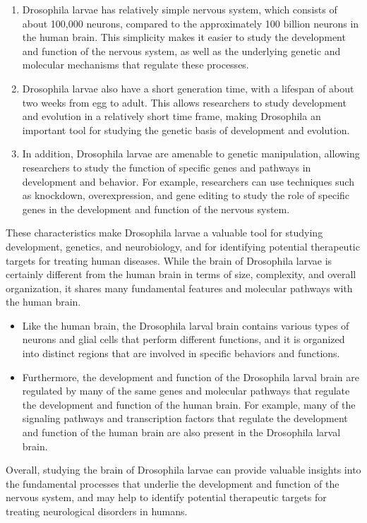 \documentclass{report}
\begin{document}
	
	\begin{enumerate}
		\item Drosophila larvae has relatively simple nervous system, which consists of about 100,000 neurons, compared to the approximately 100 billion neurons in the human brain. This simplicity makes it easier to study the development and function of the nervous system, as well as the underlying genetic and molecular mechanisms that regulate these processes.
		\item Drosophila larvae also have a short generation time, with a lifespan of about two weeks from egg to adult. This allows researchers to study development and evolution in a relatively short time frame, making Drosophila an important tool for studying the genetic basis of development and evolution.
		\item In addition, Drosophila larvae are amenable to genetic manipulation, allowing researchers to study the function of specific genes and pathways in development and behavior. For example, researchers can use techniques such as knockdown, overexpression, and gene editing to study the role of specific genes in the development and function of the nervous system.
	\end{enumerate}	
	
	These characteristics make Drosophila larvae a valuable tool for studying development, genetics, and neurobiology, and for identifying potential therapeutic targets for treating human diseases. While the brain of Drosophila larvae is certainly different from the human brain in terms of size, complexity, and overall organization, it shares many fundamental features and molecular pathways with the human brain.
	\begin{itemize}
		\item Like the human brain, the Drosophila larval brain contains various types of neurons and glial cells that perform different functions, and it is organized into distinct regions that are involved in specific behaviors and functions.
		\item Furthermore, the development and function of the Drosophila larval brain are regulated by many of the same genes and molecular pathways that regulate the development and function of the human brain. For example, many of the signaling pathways and transcription factors that regulate the development and function of the human brain are also present in the Drosophila larval brain.
	\end{itemize}
	
	Overall, studying the brain of Drosophila larvae can provide valuable insights into the fundamental processes that underlie the development and function of the nervous system, and may help to identify potential therapeutic targets for treating neurological disorders in humans.
	
\end{document}
